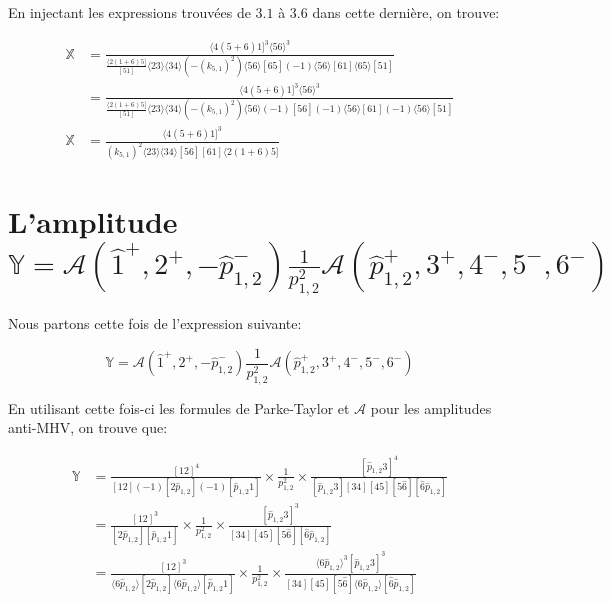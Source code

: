 \documentclass[12pt, a4paper]{article}
\begin{document}
		En injectant les expressions trouvées de $3.1$ à $3.6$ dans cette dernière, on trouve:
		
		\begin{equation}
			\begin{split}
				\mathbb{X}
				&=\frac{\langle 4(5+6)1]^3 \langle 56 \rangle^3}{\frac{\langle 2(1+6)5]}{[51]} \langle 23 \rangle \langle 34 \rangle (-(k_{5,1})^2)\langle 56 \rangle [65]
				(-1)\langle 56 \rangle [61]\langle 65 \rangle [51]}\\
				&=\frac{\langle 4(5+6)1]^3 \langle 56 \rangle^3}{\frac{\langle 2(1+6)5]}{[51]} \langle 23 \rangle \langle 34 \rangle (-(k_{5,1})^2)\langle 56 \rangle (-1)[56]
				(-1)\langle 56 \rangle [61](-1)\langle 56 \rangle [51]}\\
				\mathbb{X}&=\frac{\langle 4(5+6)1]^3 }{(k_{5,1})^2  \langle 23 \rangle \langle 34 \rangle [56][61]\langle 2(1+6)5]}
			\end{split}
		\end{equation}		
		
		\section{L'amplitude $\mathbb{Y}=\mathcal{A}(\hat{1}^+, 2^+, -\hat{p}_{1,2}^-) \frac{1}{p_{1,2}^2} \mathcal{A}(\hat{p}_{1,2}^+, 3^+, 4^-, 5^-, 6^-)$}
		
		Nous partons cette fois de l'expression suivante:
		
		\[\mathbb{Y}=\mathcal{A}(\hat{1}^+, 2^+, -\hat{p}_{1,2}^-) \frac{1}{p_{1,2}^2} \mathcal{A}(\hat{p}_{1,2}^+, 3^+, 4^-, 5^-, 6^-)\]
		
		En utilisant cette fois-ci les formules de Parke-Taylor et $\mathcal{A}$ pour les amplitudes anti-MHV, on trouve que:
		
		\begin{equation}
			\begin{split}
				\mathbb{Y}
				&=\frac{[12]^4}{[12](-1)[2\hat{p}_{1,2}](-1)[\hat{p}_{1,2}1]} 
				\times \frac{1}{p_{1,2}^2} \times
				\frac{[\hat{p}_{1,2}3]^4}{[\hat{p}_{1,2}3][34][45][5\hat{6}][\hat{6}\hat{p}_{1,2}]} \\
				&=\frac{[12]^3}{[2\hat{p}_{1,2}][\hat{p}_{1,2}1]} 
				\times \frac{1}{p_{1,2}^2} \times
				\frac{[\hat{p}_{1,2}3]^3}{[34][45][5\hat{6}][\hat{6}\hat{p}_{1,2}]} \\
				&=\frac{[12]^3}{\langle 6 \hat{p}_{1,2} \rangle[2\hat{p}_{1,2}]\langle 6 \hat{p}_{1,2} \rangle[\hat{p}_{1,2}1]} 
				\times \frac{1}{p_{1,2}^2} \times
				\frac{\langle 6 \hat{p}_{1,2} \rangle^3 [\hat{p}_{1,2}3]^3}{[34][45][5\hat{6}]\langle 6 \hat{p}_{1,2} \rangle[\hat{6}\hat{p}_{1,2}]} \\
			\end{split}
		\end{equation}
		
\end{document}
